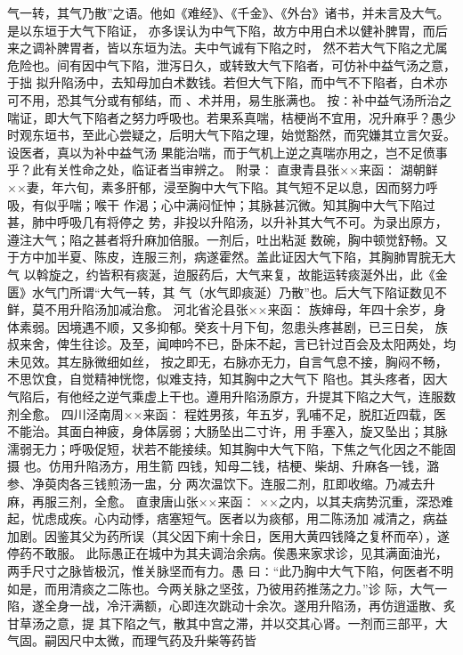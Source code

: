 \documentclass[a4paper,12pt,UTF8,twoside]{ctexbook}
\begin{document}
气一转，其气乃散”之语。他如《难经》、《千金》、《外台》诸书，并未言及大气。是以东垣于大气下陷证， 
亦多误认为中气下陷，故方中用白术以健补脾胃，而后来之调补脾胃者，皆以东垣为法。夫中气诚有下陷之时， 
然不若大气下陷之尤属危险也。间有因中气下陷，泄泻日久，或转致大气下陷者，可仿补中益气汤之意，于拙 
拟升陷汤中，去知母加白术数钱。若但大气下陷，而中气不下陷者，白术亦可不用，恐其气分或有郁结，而 
、术并用，易生胀满也。 
按∶补中益气汤所治之喘证，即大气下陷者之努力呼吸也。若果系真喘，桔梗尚不宜用，况升麻乎？愚少 
时观东垣书，至此心尝疑之，后明大气下陷之理，始觉豁然，而究嫌其立言欠妥。设医者，真以为补中益气汤 
果能治喘，而于气机上逆之真喘亦用之，岂不足偾事乎？此有关性命之处，临证者当审辨之。 
附录∶ 
直隶青县张××来函∶ 
湖朝鲜××妻，年六旬，素多肝郁，浸至胸中大气下陷。其气短不足以息，因而努力呼吸，有似乎喘；喉干 
作渴；心中满闷怔忡；其脉甚沉微。知其胸中大气下陷过甚，肺中呼吸几有将停之 
势，非投以升陷汤，以升补其大气不可。为录出原方，遵注大气；陷之甚者将升麻加倍服。一剂后，吐出粘涎 
数碗，胸中顿觉舒畅。又于方中加半夏、陈皮，连服三剂，病遂霍然。盖此证因大气下陷，其胸肺胃脘无大气 
以斡旋之，约皆积有痰涎，迨服药后，大气来复，故能运转痰涎外出，此《金匮》水气门所谓“大气一转，其 
气（水气即痰涎）乃散”也。后大气下陷证数见不鲜，莫不用升陷汤加减治愈。 
河北省沦县张××来函∶ 
族婶母，年四十余岁，身体素弱。因境遇不顺，又多抑郁。癸亥十月下旬，忽患头疼甚剧，已三日矣， 
族叔来舍，俾生往诊。及至，闻呻吟不已，卧床不起，言已针过百会及太阳两处，均未见效。其左脉微细如丝， 
按之即无，右脉亦无力，自言气息不接，胸闷不畅，不思饮食，自觉精神恍惚，似难支持，知其胸中之大气下 
陷也。其头疼者，因大气陷后，有他经之逆气乘虚上干也。遵用升陷汤原方，升提其下陷之大气，连服数剂全愈。 
四川泾南周××来函∶ 
程姓男孩，年五岁，乳哺不足，脱肛近四载，医不能治。其面白神疲，身体孱弱；大肠坠出二寸许，用 
手塞入，旋又坠出；其脉濡弱无力；呼吸促短，状若不能接续。知其胸中大气下陷，下焦之气化因之不能固摄 
也。仿用升陷汤方，用生箭 四钱，知母二钱，桔梗、柴胡、升麻各一钱，潞参、净萸肉各三钱煎汤一盅，分 
两次温饮下。连服二剂，肛即收缩。乃减去升麻，再服三剂，全愈。 
直隶唐山张××来函∶ 
××之内，以其夫病势沉重，深恐难起，忧虑成疾。心内动悸，痞塞短气。医者以为痰郁，用二陈汤加 
减清之，病益加剧。因鉴其父为药所误（其父因下痢十余日，医用大黄四钱降之复杯而卒），遂停药不敢服。 
此际愚正在城中为其夫调治余病。俟愚来家求诊，见其满面油光，两手尺寸之脉皆极沉，惟关脉坚而有力。愚 
曰∶“此乃胸中大气下陷，何医者不明如是，而用清痰之二陈也。今两关脉之坚弦，乃彼用药推荡之力。”诊 
际，大气一陷，遂全身一战，冷汗满额，心即连次跳动十余次。遂用升陷汤，再仿逍遥散、炙甘草汤之意，提 
其下陷之气，散其中宫之滞，并以交其心肾。一剂而三部平，大气固。嗣因尺中太微，而理气药及升柴等药皆 
\end{document}

